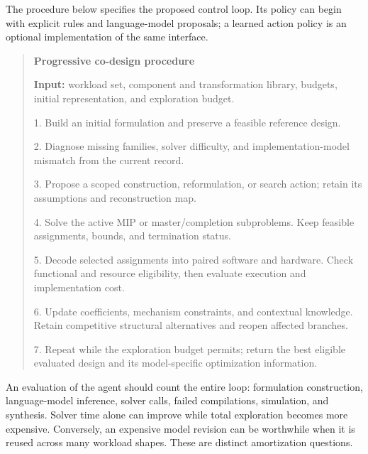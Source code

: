 The procedure below specifies the proposed control loop. Its policy can begin with explicit rules and language-model proposals; a learned action policy is an optional implementation of the same interface.

\begin{quote}
\small
\textbf{Progressive co-design procedure}\par
\textbf{Input:} workload set, component and transformation library, budgets, initial representation, and exploration budget.\par
1. Build an initial formulation and preserve a feasible reference design.\par
2. Diagnose missing families, solver difficulty, and implementation-model mismatch from the current record.\par
3. Propose a scoped construction, reformulation, or search action; retain its assumptions and reconstruction map.\par
4. Solve the active MIP or master/completion subproblems. Keep feasible assignments, bounds, and termination status.\par
5. Decode selected assignments into paired software and hardware. Check functional and resource eligibility, then evaluate execution and implementation cost.\par
6. Update coefficients, mechanism constraints, and contextual knowledge. Retain competitive structural alternatives and reopen affected branches.\par
7. Repeat while the exploration budget permits; return the best eligible evaluated design and its model-specific optimization information.
\end{quote}

An evaluation of the agent should count the entire loop: formulation construction, language-model inference, solver calls, failed compilations, simulation, and synthesis. Solver time alone can improve while total exploration becomes more expensive. Conversely, an expensive model revision can be worthwhile when it is reused across many workload shapes. These are distinct amortization questions.
